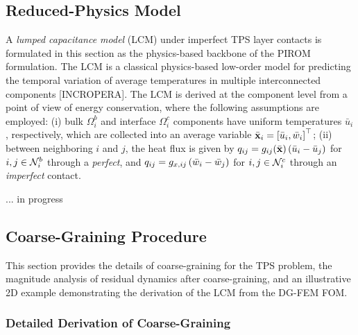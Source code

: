 \subsection{Reduced-Physics Model}

A \emph{lumped capacitance model} (LCM) under imperfect TPS layer contacts is formulated in this section as the physics-based backbone of the PIROM formulation. The LCM is a classical physics-based low-order model for predicting the temporal variation of average temperatures in multiple interconnected components [INCROPERA]. The LCM is derived at the component level from a point of view of energy conservation, where the following assumptions are employed: (i) bulk $\Omega_i^b$ and interface $\Omega_i^{c}$ components have uniform temperatures $\bar{u}_i$, respectively, which are collected into an average variable $\bar{\mathbf{x}}_i=\left[\bar{u}_i,\bar{w}_i\right]^\top$; (ii) between neighboring $i$ and $j$, the heat flux is given by $q_{ij} = g_{ij}(\bar{\mathbf{x}})\left(\bar{u}_i - \bar{u}_j\right)$ for $i,j\in\mathcal{N}_i^b$ through a \emph{perfect}, and $q_{ij} = g_{x,ij}\left(\bar{w}_i-\bar{w}_j\right)$ for $i,j\in\mathcal{N}_i^c$ through an \emph{imperfect} contact.

... in progress


\subsection{Coarse-Graining Procedure}

This section provides the details of coarse-graining for the TPS problem, the magnitude analysis of residual dynamics after coarse-graining, and an illustrative 2D example demonstrating the derivation of the LCM from the DG-FEM FOM.

\subsubsection{Detailed Derivation of Coarse-Graining}

